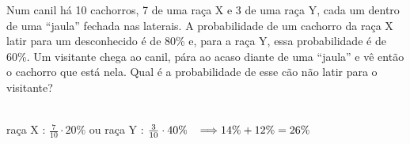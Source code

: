 \begin{ex}
Num canil há 10 cachorros, 7 de uma raça X e 3 de uma raça Y, cada um dentro de uma “jaula” fechada nas laterais. A probabilidade de um cachorro da raça X latir para um desconhecido é de 80\% e, para a raça Y, essa probabilidade é de 60\%. Um visitante chega ao canil, pára ao acaso diante de uma “jaula” e vê então o cachorro que está nela. Qual é a probabilidade de esse cão não latir para o visitante?
  \begin{sol}
    \phantom{A}\\
    raça X : $\frac{7}{10}\cdot20\%$ \hspace{0,2cm} ou \hspace{0,2cm} raça Y : $\frac{3}{10}\cdot40\% \hspace{0,3cm}
    \Longrightarrow 14\% + 12\%=26\%$
  \end{sol}
\end{ex}